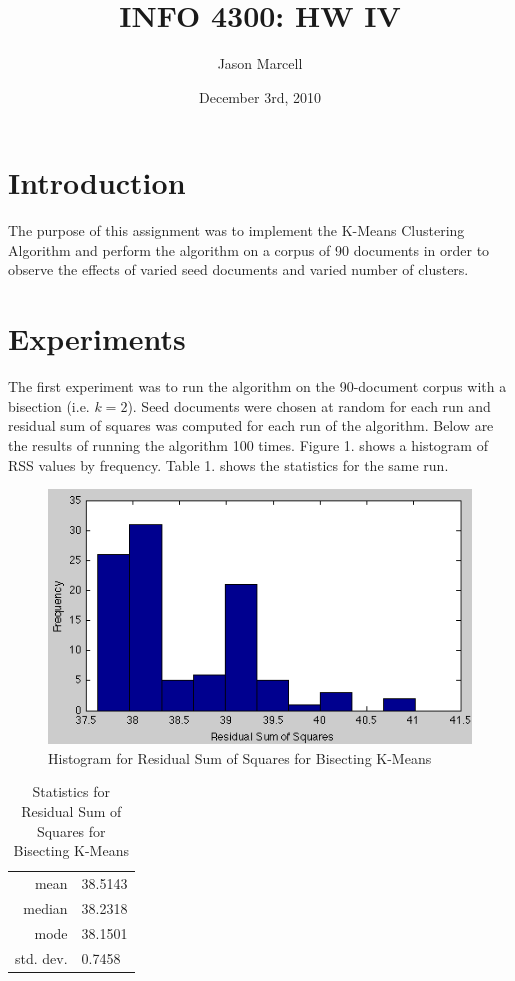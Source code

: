 \documentclass[12pt]{article}
\title{INFO 4300: HW IV}
\author{Jason Marcell}
\date{December 3rd, 2010}
\begin{document}
 
\maketitle 
\newpage
\section{Introduction} %
\label{sec:introduction}
The purpose of this assignment was to implement the K-Means Clustering Algorithm and perform the algorithm on a corpus of 90 documents in order to observe the effects of varied seed documents and varied number of clusters.

\section{Experiments} %
\label{sec:experiments}

The first experiment was to run the algorithm on the 90-document corpus with a bisection (i.e. $k = 2$). Seed documents were chosen at random for each run and residual sum of squares was computed for each run of the algorithm. Below are the results of running the algorithm 100 times. Figure 1. shows a histogram of RSS values by frequency. Table 1. shows the statistics for the same run.

\begin{figure}[h!]
  \centering
  \includegraphics[scale=0.6]{histogram.png}
  \caption{Histogram for Residual Sum of Squares for Bisecting K-Means}
\end{figure}

\begin{table}[h!]
  \centering
  \begin{tabular}{r|l}
    mean      &38.5143\\
    median    &38.2318\\
    mode      &38.1501\\
    std. dev. &0.7458
  \end{tabular}
  \caption{Statistics for Residual Sum of Squares for Bisecting K-Means}
\end{table}
\end{document}
